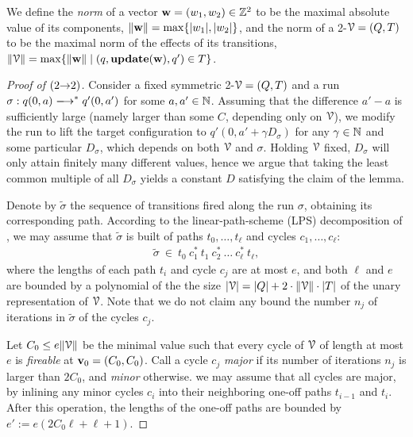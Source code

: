 We define the \emph{norm} of a vector $\mathbf{w} = (w_1,w_2) \in \mathbb{Z}^2$ 
to be the maximal absolute value of its components,
$\lVert\mathbf{w}\rVert=\max\{|w_1|,|w_2|\}$, and 
the norm of a 2-\vass $\mathcal{V}=(Q,T)$ to be the maximal norm of the effects 
of its transitions, 
$\lVert\mathcal{V}\rVert = \max\{\lVert\mathbf{w}\rVert \mid (q,\textbf{update}(\mathbf{w}),q')\in T\}$.


\begin{proof}[Proof of  $({2}{\rightarrow}{2})$]
Consider a fixed symmetric 2-\vass $\mathcal{V} = (Q,T)$ and
a run $\sigma : q(0,a)\step^* q'(0,a')$ for some $a, a'\in \mathbb{N}$.
Assuming that the difference $a'-a$ is sufficiently large
(namely larger than some $C$, depending only on $\mathcal{V}$),
we modify the run to lift the target configuration to $q'(0,a'+\gamma D_\sigma)$ for any
$\gamma \in \mathbb{N}$ and some particular $D_\sigma$, which depends on both $\mathcal{V}$ and $\sigma$.
Holding $\mathcal{V}$ fixed, $D_\sigma$ will only attain finitely many different values,
hence we argue that taking the least common multiple of all $D_\sigma$ yields a
constant $D$ satisfying the claim of the lemma.

Denote by $\widetilde \sigma$ the sequence of transitions fired along
the run $\sigma$, obtaining its corresponding path.
According to the linear-path-scheme (LPS) decomposition of 
\cite[Thm.~1]{Blondin15}, 
we may assume \mywlog that 
$\widetilde\sigma$ is built of paths 
$t_0, \ldots, t_\ell$ and cycles $c_1, \ldots, c_\ell$:
\begin{align}\label{eq:lps}
\widetilde\sigma \ \in \ t_0 \ c_1^* \ t_1 \ c_2^* \ \ldots \ c_\ell^* \ t_\ell,
\end{align}
where the lengths of each path $t_i$ and cycle $c_j$ are at most $e$,
and both $\ell$ and $e$ are bounded by a polynomial of the the size
$
 |\mathcal{V}| = 
|Q| + 
2 \cdot \lVert\mathcal{V}\rVert \cdot |T|
$
of the unary representation of $\mathcal{V}$.
Note that we do not claim any bound the number $n_j$ of iterations
in $\widetilde\sigma$ of the cycles $c_j$.

Let $C_0 \leq e \lVert\mathcal{V}\rVert$ be the minimal value such that every cycle of $\mathcal{V}$
of length at most $e$ is \emph{fireable} at $\mathbf{v}_0=(C_0, C_0)$.
Call a cycle $c_j$ \emph{major} if its number of iterations $n_j$ is larger
than $2 C_0$, and \emph{minor} otherwise.
\Mywlog we may assume that all cycles are major,
by inlining any minor cycles $c_i$ into their neighboring one-off paths $t_{i-1}$ and $t_i$.
After this operation, the lengths of the one-off paths are bounded by
$e' := e (2C_0 \ell + \ell + 1)$.


\end{proof}
